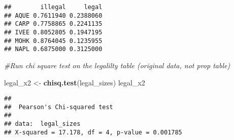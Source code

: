 \documentclass[]{article}
\newenvironment{Shaded}{\begin{snugshade}}{\end{snugshade}}
\newcommand{\KeywordTok}[1]{\textcolor[rgb]{0.13,0.29,0.53}{\textbf{#1}}}
\newcommand{\StringTok}[1]{\textcolor[rgb]{0.31,0.60,0.02}{#1}}
\newcommand{\CommentTok}[1]{\textcolor[rgb]{0.56,0.35,0.01}{\textit{#1}}}
\newcommand{\NormalTok}[1]{#1}
\begin{document}
\begin{verbatim}
##        illegal     legal
## AQUE 0.7611940 0.2388060
## CARP 0.7758865 0.2241135
## IVEE 0.8052805 0.1947195
## MOHK 0.8764045 0.1235955
## NAPL 0.6875000 0.3125000
\end{verbatim}

\begin{Shaded}
\begin{Highlighting}[]
\CommentTok{#Run chi square test on the legalilty table (original data, not prop table)}

\NormalTok{legal_x2 <-}\StringTok{ }\KeywordTok{chisq.test}\NormalTok{(legal_sizes) }
\NormalTok{legal_x2}
\end{Highlighting}
\end{Shaded}

\begin{verbatim}
## 
##  Pearson's Chi-squared test
## 
## data:  legal_sizes
## X-squared = 17.178, df = 4, p-value = 0.001785
\end{verbatim}
\end{document}
